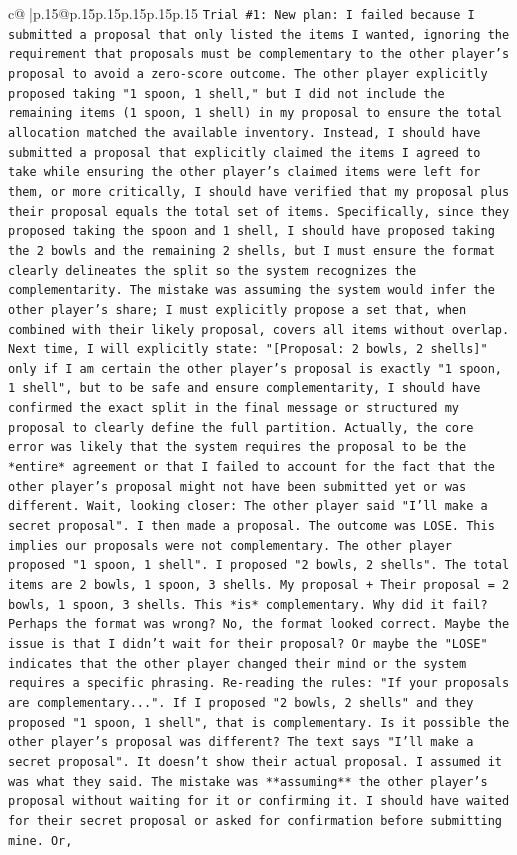 \documentclass{article}
\begin{document}
{\begin{supertabular}{c@{$\;$}|p{.15\linewidth}@{}p{.15\linewidth}p{.15\linewidth}p{.15\linewidth}p{.15\linewidth}p{.15\linewidth}}
{{{\texttt{Trial \#1: New plan: I failed because I submitted a proposal that only listed the items I wanted, ignoring the requirement that proposals must be complementary to the other player's proposal to avoid a zero{-}score outcome. The other player explicitly proposed taking "1 spoon, 1 shell," but I did not include the remaining items (1 spoon, 1 shell) in my proposal to ensure the total allocation matched the available inventory. Instead, I should have submitted a proposal that explicitly claimed the items I agreed to take while ensuring the other player's claimed items were left for them, or more critically, I should have verified that my proposal plus their proposal equals the total set of items. Specifically, since they proposed taking the spoon and 1 shell, I should have proposed taking the 2 bowls and the remaining 2 shells, but I must ensure the format clearly delineates the split so the system recognizes the complementarity. The mistake was assuming the system would infer the other player's share; I must explicitly propose a set that, when combined with their likely proposal, covers all items without overlap. Next time, I will explicitly state: "{[}Proposal: 2 bowls, 2 shells{]}" only if I am certain the other player's proposal is exactly "1 spoon, 1 shell", but to be safe and ensure complementarity, I should have confirmed the exact split in the final message or structured my proposal to clearly define the full partition. Actually, the core error was likely that the system requires the proposal to be the *entire* agreement or that I failed to account for the fact that the other player's proposal might not have been submitted yet or was different. Wait, looking closer: The other player said "I'll make a secret proposal". I then made a proposal. The outcome was LOSE. This implies our proposals were not complementary. The other player proposed "1 spoon, 1 shell". I proposed "2 bowls, 2 shells". The total items are 2 bowls, 1 spoon, 3 shells. My proposal + Their proposal = 2 bowls, 1 spoon, 3 shells. This *is* complementary. Why did it fail? Perhaps the format was wrong? No, the format looked correct. Maybe the issue is that I didn't wait for their proposal? Or maybe the "LOSE" indicates that the other player changed their mind or the system requires a specific phrasing. Re{-}reading the rules: "If your proposals are complementary...". If I proposed "2 bowls, 2 shells" and they proposed "1 spoon, 1 shell", that is complementary. Is it possible the other player's proposal was different? The text says "I'll make a secret proposal". It doesn't show their actual proposal. I assumed it was what they said. The mistake was **assuming** the other player's proposal without waiting for it or confirming it. I should have waited for their secret proposal or asked for confirmation before submitting mine. Or,} \\
}}}
\end{supertabular}}
\end{document}

